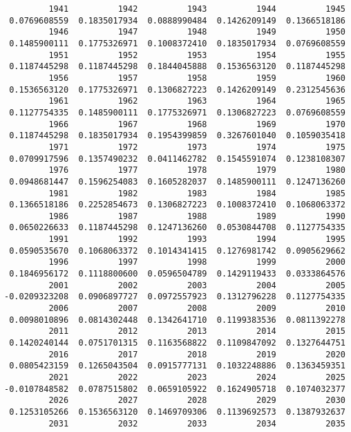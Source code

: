 \documentclass[
  letterpaper,
  DIV=11,
  numbers=noendperiod]{scrreprt}
\begin{document}
\begin{verbatim}
         1941          1942          1943          1944          1945 
 0.0769608559  0.1835017934  0.0888990484  0.1426209149  0.1366518186 
         1946          1947          1948          1949          1950 
 0.1485900111  0.1775326971  0.1008372410  0.1835017934  0.0769608559 
         1951          1952          1953          1954          1955 
 0.1187445298  0.1187445298  0.1844045888  0.1536563120  0.1187445298 
         1956          1957          1958          1959          1960 
 0.1536563120  0.1775326971  0.1306827223  0.1426209149  0.2312545636 
         1961          1962          1963          1964          1965 
 0.1127754335  0.1485900111  0.1775326971  0.1306827223  0.0769608559 
         1966          1967          1968          1969          1970 
 0.1187445298  0.1835017934  0.1954399859  0.3267601040  0.1059035418 
         1971          1972          1973          1974          1975 
 0.0709917596  0.1357490232  0.0411462782  0.1545591074  0.1238108307 
         1976          1977          1978          1979          1980 
 0.0948681447  0.1596254083  0.1605282037  0.1485900111  0.1247136260 
         1981          1982          1983          1984          1985 
 0.1366518186  0.2252854673  0.1306827223  0.1008372410  0.1068063372 
         1986          1987          1988          1989          1990 
 0.0650226633  0.1187445298  0.1247136260  0.0530844708  0.1127754335 
         1991          1992          1993          1994          1995 
 0.0590535670  0.1068063372  0.1014341415  0.1276981742  0.0905629662 
         1996          1997          1998          1999          2000 
 0.1846956172  0.1118800600  0.0596504789  0.1429119433  0.0333864576 
         2001          2002          2003          2004          2005 
-0.0209323208  0.0906897727  0.0972557923  0.1312796228  0.1127754335 
         2006          2007          2008          2009          2010 
 0.0098010896  0.0814302448  0.1342641710  0.1199383536  0.0811392278 
         2011          2012          2013          2014          2015 
 0.1420240144  0.0751701315  0.1163568822  0.1109847092  0.1327644751 
         2016          2017          2018          2019          2020 
 0.0805423159  0.1265043504  0.0915777131  0.1032248886  0.1363459351 
         2021          2022          2023          2024          2025 
-0.0107848582  0.0787515802  0.0659105922  0.1624905718  0.1074032377 
         2026          2027          2028          2029          2030 
 0.1253105266  0.1536563120  0.1469709306  0.1139692573  0.1387932637 
         2031          2032          2033          2034          2035 

\end{verbatim}
\end{document}
